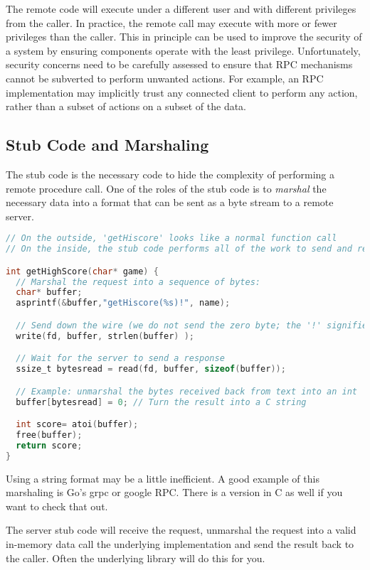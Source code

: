 The remote code will execute under a different user and with different privileges from the caller.
In practice, the remote call may execute with more or fewer privileges than the caller.
This in principle can be used to improve the security of a system by ensuring components operate with the least privilege.
Unfortunately, security concerns need to be carefully assessed to ensure that RPC mechanisms cannot be subverted to perform unwanted actions.
For example, an RPC implementation may implicitly trust any connected client to perform any action, rather than a subset of actions on a subset of the data.

\subsection{Stub Code and Marshaling}

The stub code is the necessary code to hide the complexity of performing a remote procedure call.
One of the roles of the stub code is to \emph{marshal} the necessary data into a format that can be sent as a byte stream to a remote server.

\begin{lstlisting}[language=C]
// On the outside, 'getHiscore' looks like a normal function call
// On the inside, the stub code performs all of the work to send and receive data to and from the remote machine.

int getHighScore(char* game) {
  // Marshal the request into a sequence of bytes:
  char* buffer;
  asprintf(&buffer,"getHiscore(%s)!", name);

  // Send down the wire (we do not send the zero byte; the '!' signifies the end of the message)
  write(fd, buffer, strlen(buffer) );

  // Wait for the server to send a response
  ssize_t bytesread = read(fd, buffer, sizeof(buffer));

  // Example: unmarshal the bytes received back from text into an int
  buffer[bytesread] = 0; // Turn the result into a C string

  int score= atoi(buffer);
  free(buffer);
  return score;
}
\end{lstlisting}

Using a string format may be a little inefficient.
A good example of this marshaling is Go's grpc or google RPC. There is a version in C as well if you want to check that out.

The server stub code will receive the request, unmarshal the request into a valid in-memory data call the underlying implementation and send the result back to the caller.
Often the underlying library will do this for you.

